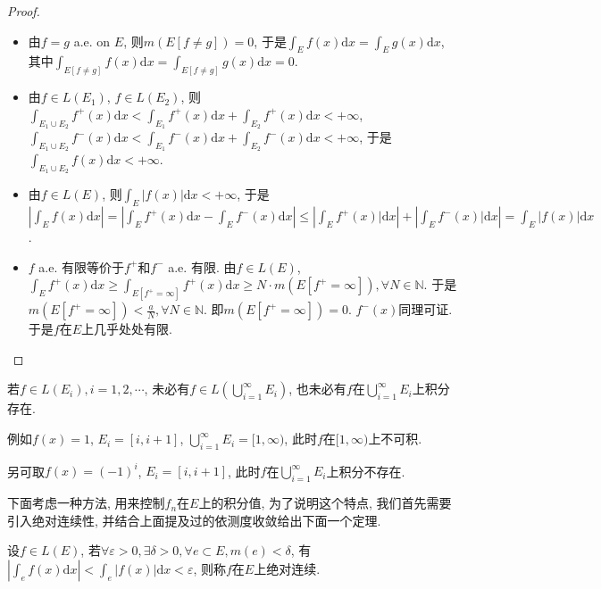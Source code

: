 \documentclass[theorem=false,mathfont=none,openany,sub3section]{easybook}
\begin{document}
\begin{proof}
  \begin{itemize}
    \item 由$f=g$ a.e. on $E$, 则$m(E[f\ne g])=0$, 于是$\int_{E}f(x)\mathrm{d}x=\int_{E}g(x)\mathrm{d}x$, 其中$\int_{E[f\ne g]}f(x)\mathrm{d}x=\int_{E[f\ne g]}g(x)\mathrm{d}x=0$.\par
    \item 由$f\in L(E_1)$, $f\in L(E_2)$, 则$\int_{E_1\cup E_2}f^{+}(x)\mathrm{d}x<\int_{E_1}f^{+}(x)\mathrm{d}x+\int_{E_2}f^{+}(x)\mathrm{d}x<+\infty$, $\int_{E_1\cup E_2}f^{-}(x)\mathrm{d}x<\int_{E_1}f^{-}(x)\mathrm{d}x+\int_{E_2}f^{-}(x)\mathrm{d}x<+\infty$, 于是$\int_{E_1\cup E_2}f(x)\mathrm{d}x<+\infty$.\par
    \item 由$f\in L(E)$, 则$\int_{E}|f(x)|\mathrm{d}x<+\infty$, 于是$\left|\int_{E}f(x)\mathrm{d}x\right|=\left|\int_{E}f^{+}(x)\mathrm{d}x-\int_{E}f^{-}(x)\mathrm{d}x\right|\leqslant \left|\int_{E}f^{+}(x)|\mathrm{d}x\right|+\left|\int_{E}f^{-}(x)|\mathrm{d}x\right|=\int_{E}\left|f(x)\right|\mathrm{d}x$.\par
    \item $f$ a.e. 有限等价于$f^{+}$和$f^{-}$ a.e. 有限. 由$f\in L(E)$, $\int_{E}f^{+}(x)\mathrm{d}x\geqslant \int_{E[f^{+}=\infty]}f^{+}(x)\mathrm{d}x\geqslant N\cdot m(E[f^{+}=\infty]), \forall N \in \mathbb{N}$. 于是$m(E[f^{+}=\infty])<\frac{a}{N}, \forall N\in \mathbb{N}$. 即$m(E[f^{+}=\infty])=0$. $f^{-}(x)$同理可证. 于是$f$在$E$上几乎处处有限.\par
  \end{itemize}
\end{proof}

\begin{remark}
  若$f\in L(E_i), i=1,2,\cdots$, 未必有$f\in L\left(\bigcup_{i=1}^{\infty}E_i\right)$, 也未必有$f$在$\bigcup_{i=1}^{\infty}E_i$上积分存在.\par
  例如$f(x)=1$, $E_i=[i,i+1]$, $\bigcup_{i=1}^{\infty}E_i=[1,\infty)$, 此时$f$在$[1,\infty)$上不可积.\par
  另可取$f(x)=(-1)^{i}$, $E_i=[i,i+1]$, 此时$f$在$\bigcup_{i=1}^{\infty}E_i$上积分不存在.\par
\end{remark}

下面考虑一种方法, 用来控制$f_n$在$E$上的积分值, 为了说明这个特点, 我们首先需要引入绝对连续性, 并结合上面提及过的依测度收敛给出下面一个定理.\par

\begin{definition}
  设$f\in L(E)$, 若$\forall \varepsilon >0, \exists \delta >0, \forall e\subset E, m(e)<\delta$, 有$\left|\int_{e}f(x)\mathrm{d}x\right|<\int_{e}\left|f(x)\right|\mathrm{d}x<\varepsilon$, 则称$f$在$E$上绝对连续.\par
\end{definition}
\end{document}

